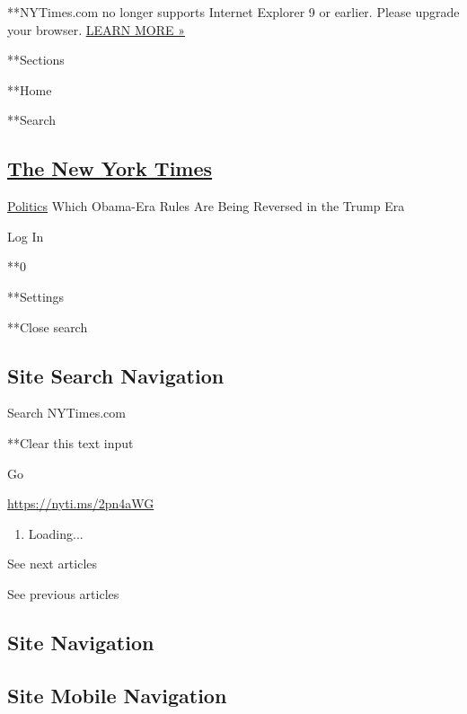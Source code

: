  **NYTimes.com no longer supports Internet Explorer 9 or earlier. Please
upgrade your browser.
\href{http://www.nytimes3xbfgragh.onion/content/help/site/ie9-support.html}{LEARN
MORE »}

**Sections

**Home

**Search

\hypertarget{the-new-york-times}{%
\subsection{\texorpdfstring{\href{http://www.nytimes3xbfgragh.onion/}{The
New York Times}}{The New York Times}}\label{the-new-york-times}}

 \href{/section/politics}{Politics} \textbar{}Which Obama-Era Rules Are
Being Reversed in the Trump Era

Log In

**0

**Settings

**Close search

\hypertarget{site-search-navigation}{%
\subsection{Site Search Navigation}\label{site-search-navigation}}

Search NYTimes.com

**Clear this text input

Go

\url{https://nyti.ms/2pn4aWG}

\begin{enumerate}
\def\labelenumi{\arabic{enumi}.}
\item
  Loading...
\end{enumerate}

See next articles

See previous articles

\hypertarget{site-navigation}{%
\subsection{Site Navigation}\label{site-navigation}}

\hypertarget{site-mobile-navigation}{%
\subsection{Site Mobile Navigation}\label{site-mobile-navigation}}

